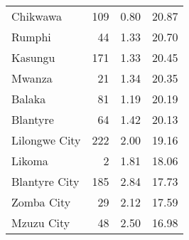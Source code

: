 \begin{tabular}{lrrr}
Chikwawa       &     109 &           0.80 &               20.87 \\
Rumphi         &      44 &           1.33 &               20.70 \\
Kasungu        &     171 &           1.33 &               20.45 \\
Mwanza         &      21 &           1.34 &               20.35 \\
Balaka         &      81 &           1.19 &               20.19 \\
Blantyre       &      64 &           1.42 &               20.13 \\
Lilongwe City  &     222 &           2.00 &               19.16 \\
Likoma         &       2 &           1.81 &               18.06 \\
Blantyre City  &     185 &           2.84 &               17.73 \\
Zomba City     &      29 &           2.12 &               17.59 \\
Mzuzu City     &      48 &           2.50 &               16.98 \\
\bottomrule
\end{tabular}
